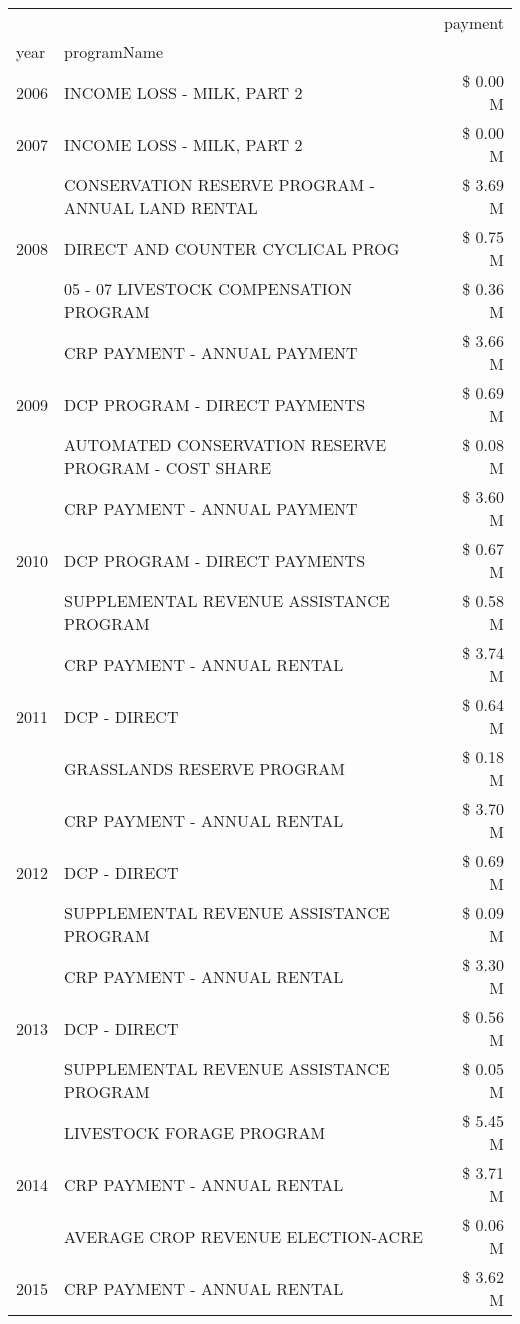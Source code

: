 \begin{tabular}{llr}
\toprule
 &  & payment \\
year & programName &  \\
\midrule
2006 & INCOME LOSS - MILK, PART 2 & \$ 0.00 M \\
\cline{1-3}
2007 & INCOME LOSS - MILK, PART 2 & \$ 0.00 M \\
\cline{1-3}
\multirow[t]{3}{*}{2008} & CONSERVATION RESERVE PROGRAM - ANNUAL LAND RENTAL & \$ 3.69 M \\
 & DIRECT AND COUNTER CYCLICAL PROG & \$ 0.75 M \\
 & 05 - 07 LIVESTOCK COMPENSATION PROGRAM & \$ 0.36 M \\
\cline{1-3}
\multirow[t]{3}{*}{2009} & CRP PAYMENT - ANNUAL PAYMENT & \$ 3.66 M \\
 & DCP PROGRAM - DIRECT PAYMENTS & \$ 0.69 M \\
 & AUTOMATED CONSERVATION RESERVE PROGRAM - COST SHARE & \$ 0.08 M \\
\cline{1-3}
\multirow[t]{3}{*}{2010} & CRP PAYMENT - ANNUAL PAYMENT & \$ 3.60 M \\
 & DCP PROGRAM - DIRECT PAYMENTS & \$ 0.67 M \\
 & SUPPLEMENTAL REVENUE ASSISTANCE PROGRAM & \$ 0.58 M \\
\cline{1-3}
\multirow[t]{3}{*}{2011} & CRP PAYMENT - ANNUAL RENTAL & \$ 3.74 M \\
 & DCP - DIRECT & \$ 0.64 M \\
 & GRASSLANDS RESERVE PROGRAM & \$ 0.18 M \\
\cline{1-3}
\multirow[t]{3}{*}{2012} & CRP PAYMENT - ANNUAL RENTAL & \$ 3.70 M \\
 & DCP - DIRECT & \$ 0.69 M \\
 & SUPPLEMENTAL REVENUE ASSISTANCE PROGRAM & \$ 0.09 M \\
\cline{1-3}
\multirow[t]{3}{*}{2013} & CRP PAYMENT - ANNUAL RENTAL & \$ 3.30 M \\
 & DCP - DIRECT & \$ 0.56 M \\
 & SUPPLEMENTAL REVENUE ASSISTANCE PROGRAM & \$ 0.05 M \\
\cline{1-3}
\multirow[t]{3}{*}{2014} & LIVESTOCK FORAGE PROGRAM & \$ 5.45 M \\
 & CRP PAYMENT - ANNUAL RENTAL & \$ 3.71 M \\
 & AVERAGE CROP REVENUE ELECTION-ACRE & \$ 0.06 M \\
\cline{1-3}
\multirow[t]{3}{*}{2015} & CRP PAYMENT - ANNUAL RENTAL & \$ 3.62 M \\

\end{tabular}
